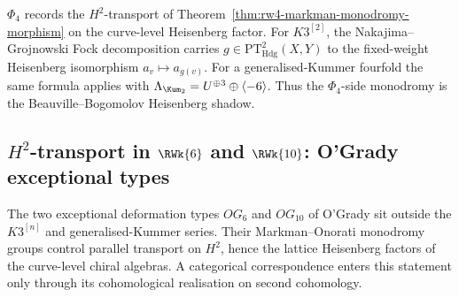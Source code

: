 \begin{remark}
\label{rem:rw4-morphism-phi-4-relation}
\(\Phi_4\) records the \(H^2\)-transport of
Theorem~\ref{thm:rw4-markman-monodromy-morphism} on the
curve-level Heisenberg factor. For \(K3^{[2]}\), the
Nakajima--Grojnowski Fock decomposition carries
\(g\in\mathrm{PT}^2_{\mathrm{Hdg}}(X,Y)\) to the fixed-weight
Heisenberg isomorphism \(a_v\mapsto a_{g(v)}\). For a
generalised-Kummer fourfold the same formula applies with
\(\Lambda_{\Kum_2}=U^{\oplus3}\oplus\langle-6\rangle\). Thus the
\(\Phi_4\)-side monodromy is the Beauville--Bogomolov Heisenberg
shadow.
\end{remark}

\subsection{\texorpdfstring{$H^2$}{H2}-transport in
\texorpdfstring{$\RWk{6}$}{RWk6} and
\texorpdfstring{$\RWk{10}$}{RWk10}: O'Grady exceptional types}
\label{subsec:rw-2n-morphism-og}

The two exceptional deformation types \(OG_6\) and \(OG_{10}\) of
O'Grady sit outside the \(K3^{[n]}\) and generalised-Kummer series. Their
Markman--Onorati monodromy groups control parallel transport on
\(H^2\), hence the lattice Heisenberg factors of the curve-level chiral
algebras. A categorical correspondence enters this statement only
through its cohomological realisation on second cohomology.


